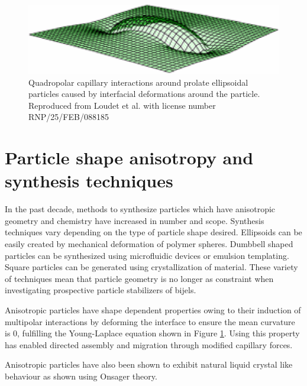 \begin{figure}
    \centering
    \includegraphics[scale = 0.5]{figures/literature_review/interfacial_curvature.png}
    \caption{Quadropolar capillary interactions around prolate ellipsoidal particles caused by interfacial deformations around the particle. 
    \cite{loudet_capillary_2005} Reproduced from Loudet et al. with license number RNP/25/FEB/088185}
    \label{fig:anisotropic_particle_interface}
\end{figure}

\section{Particle shape anisotropy and synthesis techniques}

In the past decade, methods to synthesize particles which have anisotropic geometry and chemistry have increased in number and scope. Synthesis techniques vary 
depending on the type of particle shape desired. Ellipsoids can be easily created by mechanical deformation of polymer spheres. Dumbbell shaped particles can be 
synthesized using microfluidic devices or emulsion templating. Square particles can be generated using crystallization of material. \cite{morgan_understanding_2013} 
These variety of techniques mean that particle geometry is no longer as constraint when investigating prospective particle stabilizers of bijels. 
\cite{wu_recent_2016}

Anisotropic particles have shape dependent properties owing to their induction of multipolar interactions by deforming the interface to ensure the mean 
curvature is 0,  fulfilling the Young-Laplace equation shown in Figure \ref{fig:anisotropic_particle_interface}. \cite{loudet_capillary_2005, 
cheng_shape-anisotropic_2013} Using this property has enabled directed assembly and migration through modified capillary forces. 
\cite{cavallaro_curvature-driven_2011, read_dimerization_2020, sharifi-mood_curvature_2015} 

Anisotropic particles have also been shown to exhibit natural liquid crystal like behaviour as shown using Onsager theory. 

